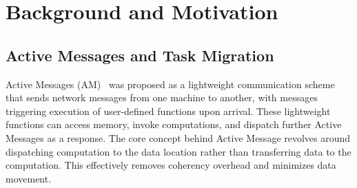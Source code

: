 \section{Background and Motivation}
\label{section:motivation}
\subsection{Active Messages and Task Migration}
\begin{comment}
Active Messages (AM)~\cite{am_culler} was proposed as a lightweight communication scheme that sends network messages from one machine to another, with the messages triggering the execution of user-defined functions upon arrival.
These lightweight functions have the capability to access memory, invoke various computations, and dispatch further Active Messages as a response.
The core concept behind Active Message revolves around the dispatching of computation to the data location rather than transferring data to the computation.
This effectively removes coherency overhead and minimizes data movement.
\end{comment}
Active Messages (AM)~\cite{am_culler} was proposed as a lightweight communication scheme that sends network messages from one machine to another, with messages triggering execution of user-defined functions upon arrival.
These lightweight functions can access memory, invoke computations, and dispatch further Active Messages as a response.
The core concept behind Active Message revolves around dispatching computation to the data location rather than transferring data to the computation.
This effectively removes coherency overhead and minimizes data movement.

